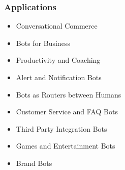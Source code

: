 \documentclass[11pt]{beamer}
\begin{document}
\begin{frame}
	\frametitle{Applications}
	\begin{itemize}
		\item Conversational Commerce
		\item Bots for Business
		\item Productivity and Coaching
		\item Alert and Notification Bots
		\item Bots as Routers between Humans
		\item Customer Service and FAQ Bots
		\item Third Party Integration Bots
		\item Games and Entertainment Bots
		\item Brand Bots
	\end{itemize}
\end{frame}
\end{document}

